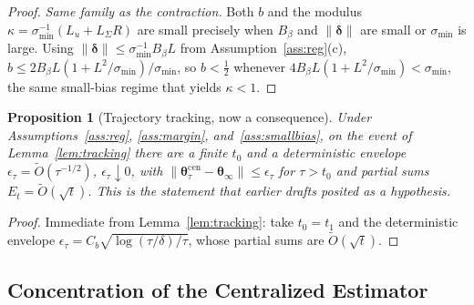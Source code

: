 \documentclass[11pt]{article}
\newtheorem{proposition}[theorem]{Proposition}
\begin{document}
\begin{proof}
\emph{Same family as the contraction.}  Both $b$ and the modulus
$\kappa=\sigma_{\min}^{-1}(L_u+L_\Sigma R)$ are small precisely when
$B_\beta$ and $\|\bm{\delta}\|$ are small or $\sigma_{\min}$ is large.
Using $\|\bm{\delta}\|\leq\sigma_{\min}^{-1}B_\beta L$ from
Assumption~\ref{ass:reg}(c),
$b\leq 2B_\beta L(1+L^2/\sigma_{\min})/\sigma_{\min}$, so $b<\tfrac12$
whenever $4B_\beta L(1+L^2/\sigma_{\min})<\sigma_{\min}$, the same
small-bias regime that yields $\kappa<1$.
\end{proof}

\begin{proposition}[Trajectory tracking, now a consequence]\label{prop:pol_conv}
Under Assumptions~\ref{ass:reg}, \ref{ass:margin}, and~\ref{ass:smallbias},
on the event of Lemma~\ref{lem:tracking} there are a finite $t_0$ and a
deterministic envelope $\epsilon_\tau=\widetilde O(\tau^{-1/2})$,
$\epsilon_\tau\downarrow 0$, with
$\|\bm{\theta}_\tau^{\mathrm{cen}}-\bm{\theta}_\infty\|\leq\epsilon_\tau$
for $\tau>t_0$ and partial sums $E_t=\widetilde O(\sqrt t)$.  This is the
statement that earlier drafts posited as a hypothesis.
\end{proposition}

\begin{proof}
Immediate from Lemma~\ref{lem:tracking}: take $t_0=t_1$ and the
deterministic envelope $\epsilon_\tau=C_b\sqrt{\log(\tau/\delta)/\tau}$,
whose partial sums are $\widetilde O(\sqrt t)$.
\end{proof}

\subsection{Concentration of the Centralized Estimator}
\end{document}
